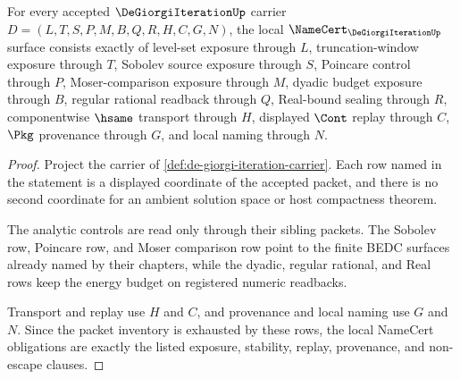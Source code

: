\begin{theorem}
\label{thm:de-giorgi-iteration-namecert-obligations}
For every accepted $\DeGiorgiIterationUp$ carrier $D=(L,T,S,P,M,B,Q,R,H,C,G,N)$, the local $\NameCert_{\DeGiorgiIterationUp}$ surface consists exactly of level-set exposure through $L$, truncation-window exposure through $T$, Sobolev source exposure through $S$, Poincare control through $P$, Moser-comparison exposure through $M$, dyadic budget exposure through $B$, regular rational readback through $Q$, Real-bound sealing through $R$, componentwise $\hsame$ transport through $H$, displayed $\Cont$ replay through $C$, $\Pkg$ provenance through $G$, and local naming through $N$.
\end{theorem}
\begin{proof}
Project the carrier of \autoref{def:de-giorgi-iteration-carrier}. Each row named in the statement is a displayed coordinate of the accepted packet, and there is no second coordinate for an ambient solution space or host compactness theorem.

The analytic controls are read only through their sibling packets. The Sobolev row, Poincare row, and Moser comparison row point to the finite BEDC surfaces already named by their chapters, while the dyadic, regular rational, and Real rows keep the energy budget on registered numeric readbacks.

Transport and replay use $H$ and $C$, and provenance and local naming use $G$ and $N$. Since the packet inventory is exhausted by these rows, the local NameCert obligations are exactly the listed exposure, stability, replay, provenance, and non-escape clauses.
\end{proof}

